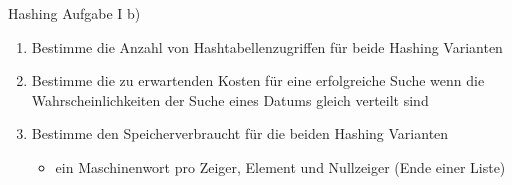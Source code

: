 	\begin{frame}{Hashing Aufgabe I b)}
		\begin{enumerate}
			\item Bestimme die Anzahl von Hashtabellenzugriffen für beide Hashing Varianten
			\item Bestimme die zu erwartenden Kosten für eine erfolgreiche Suche wenn die Wahrscheinlichkeiten der Suche eines Datums gleich verteilt sind
			\item Bestimme den Speicherverbraucht für die beiden Hashing Varianten
			\begin{itemize}
				\item ein Maschinenwort pro Zeiger, Element und Nullzeiger (Ende einer Liste) 
			\end{itemize}  
		\end{enumerate}
	\end{frame}



